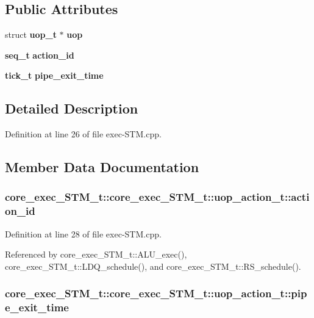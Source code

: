 \subsection*{Public Attributes}
\begin{CompactItemize}
\item 
struct {\bf uop\_\-t} $\ast$ {\bf uop}
\item 
{\bf seq\_\-t} {\bf action\_\-id}
\item 
{\bf tick\_\-t} {\bf pipe\_\-exit\_\-time}
\end{CompactItemize}


\subsection{Detailed Description}


Definition at line 26 of file exec-STM.cpp.

\subsection{Member Data Documentation}
\subsubsection[{action\_\-id}]{ core\_\-exec\_\-STM\_\-t::core\_\-exec\_\-STM\_\-t::uop\_\-action\_\-t::action\_\-id}\label{structcore__exec__STM__t_1_1uop__action__t_586c08ad468c348db472d23b1c895954}




Definition at line 28 of file exec-STM.cpp.

Referenced by core\_\-exec\_\-STM\_\-t::ALU\_\-exec(), core\_\-exec\_\-STM\_\-t::LDQ\_\-schedule(), and core\_\-exec\_\-STM\_\-t::RS\_\-schedule().
\subsubsection[{pipe\_\-exit\_\-time}]{ core\_\-exec\_\-STM\_\-t::core\_\-exec\_\-STM\_\-t::uop\_\-action\_\-t::pipe\_\-exit\_\-time}\label{structcore__exec__STM__t_1_1uop__action__t_72c1c914496e921796762edc2d24b09e}




